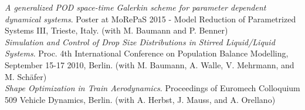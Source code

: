  \emph{A generalized POD space-time Galerkin scheme for parameter dependent dynamical systems}. Poster at MoRePaS 2015 - Model Reduction of Parametrized Systems III, Trieste, Italy. (with M. Baumann and P. Benner)\\

 \emph{Simulation and Control of Drop Size Distributions in Stirred Liquid/Liquid Systems}. Proc. 4th International Conference on Population Balance Modelling, September 15-17 2010, Berlin. (with M. Baumann, A. Walle, V. Mehrmann, and M. Schäfer)\\

 \emph{Shape Optimization in Train Aerodynamics}. Proceedings of Euromech Colloquium 509 Vehicle Dynamics, Berlin. (with A. Herbst, J. Mauss, and A. Orellano)
